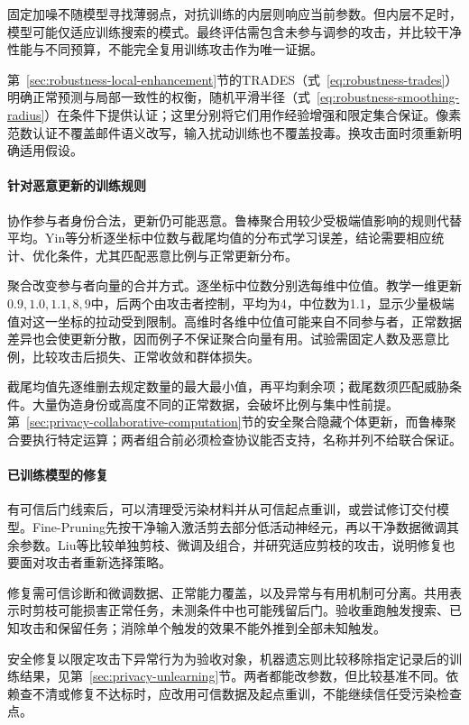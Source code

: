 固定加噪不随模型寻找薄弱点，对抗训练的内层则响应当前参数。但内层不足时，模型可能仅适应训练搜索的模式。最终评估需包含未参与调参的攻击，并比较干净性能与不同预算，不能完全复用训练攻击作为唯一证据。

第~\ref{sec:robustness-local-enhancement}节的TRADES（式~\eqref{eq:robustness-trades}）明确正常预测与局部一致性的权衡，随机平滑半径（式~\eqref{eq:robustness-smoothing-radius}）在条件下提供认证；这里分别将它们用作经验增强和限定集合保证。像素范数认证不覆盖邮件语义改写，输入扰动训练也不覆盖投毒。换攻击面时须重新明确适用假设。

\paragraph{针对恶意更新的训练规则}

协作参与者身份合法，更新仍可能恶意。鲁棒聚合用较少受极端值影响的规则代替平均。Yin等分析逐坐标中位数与截尾均值的分布式学习误差，结论需要相应统计、优化条件，尤其匹配恶意比例与正常更新分布。

聚合改变参与者向量的合并方式。逐坐标中位数分别选每维中位值。教学一维更新$0.9,1.0,1.1,8,9$中，后两个由攻击者控制，平均为4，中位数为1.1，显示少量极端值对这一坐标的拉动受到限制。高维时各维中位值可能来自不同参与者，正常数据差异也会使更新分散，因而例子不保证聚合向量有用。试验需固定人数及恶意比例，比较攻击后损失、正常收敛和群体损失。

截尾均值先逐维删去规定数量的最大最小值，再平均剩余项；截尾数须匹配威胁条件。大量伪造身份或高度不同的正常数据，会破坏比例与集中性前提。第~\ref{sec:privacy-collaborative-computation}节的安全聚合隐藏个体更新，而鲁棒聚合要执行特定运算；两者组合前必须检查协议能否支持，名称并列不给联合保证。

\paragraph{已训练模型的修复}

有可信后门线索后，可以清理受污染材料并从可信起点重训，或尝试修订交付模型。Fine-Pruning先按干净输入激活剪去部分低活动神经元，再以干净数据微调其余参数。Liu等比较单独剪枝、微调及组合，并研究适应剪枝的攻击，说明修复也要面对攻击者重新选择策略。

修复需可信诊断和微调数据、正常能力覆盖，以及异常与有用机制可分离。共用表示时剪枝可能损害正常任务，未测条件中也可能残留后门。验收重跑触发搜索、已知攻击和保留任务；消除单个触发的效果不能外推到全部未知触发。

安全修复以限定攻击下异常行为为验收对象，机器遗忘则比较移除指定记录后的训练结果，见第~\ref{sec:privacy-unlearning}节。两者都能改参数，但比较基准不同。依赖查不清或修复不达标时，应改用可信数据及起点重训，不能继续信任受污染检查点。

